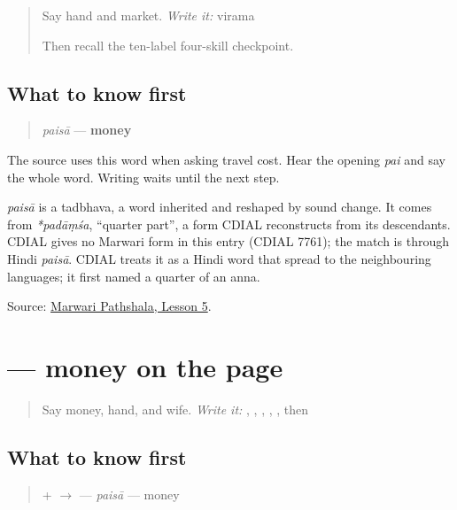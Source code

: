 \label{lesson:MW-C10-hear-paisa}



\begin{quote}
Say hand and market. \emph{Write it:} virama \textbf{}

Then recall the ten-label four-skill checkpoint.
\end{quote}

\subsection*{What to know first}
\begin{quote}
\emph{paisā} — \textbf{money}
\end{quote}

The source uses this word when asking travel cost. Hear the opening \emph{pai} and say the whole word. Writing waits until the next step.

\begin{cousinweb}
\emph{paisā} is a tadbhava, a word inherited and reshaped by sound change. It comes from \emph{*padāṃśa}, \textquotedblleft{}quarter part\textquotedblright{}, a form CDIAL reconstructs from its descendants. CDIAL gives no Marwari form in this entry (CDIAL 7761); the match is through Hindi \emph{paisā}. CDIAL treats it as a Hindi word that spread to the neighbouring languages; it first named a quarter of an anna.
\end{cousinweb}

\begin{tcolorbox}[breakable,colback=teal!4,colframe=teal!35!black,title={Before you move on}]
Source: \href{https://www.marwaripathshala.com/marwari-lesson-5-english}{Marwari Pathshala, Lesson 5}.
\end{tcolorbox}
\section[\texorpdfstring{\mw{पैसा} (paisā)}{पैसा (paisā)}]{ — money on the page}

\label{lesson:MW-C10-paisa}



\begin{quote}
Say money, hand, and wife. \emph{Write it:} \textbf{}, \textbf{}, \textbf{}, \textbf{}, \textbf{}, then \textbf{}
\end{quote}

\subsection*{What to know first}
\begin{quote}
\textbf{} + \textbf{} $\to$ \textbf{} — \emph{paisā} — money
\end{quote}

